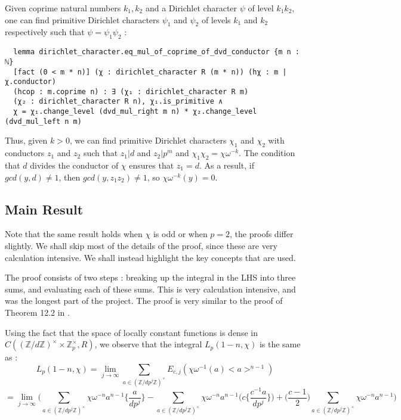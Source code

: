 \documentclass[a4paper,UKenglish,cleveref, autoref, thm-restate]{lipics-v2021}
\begin{document}
Given coprime natural numbers $k_1, k_2$ and a Dirichlet character $\psi$ of level $k_1 k_2$, one can find primitive Dirichlet characters 
$\psi_1$ and $\psi_2$ of levels $k_1$ and $k_2$ respectively such that $\psi = \psi_1 \psi_2$ : 
\begin{lstlisting}
  lemma dirichlet_character.eq_mul_of_coprime_of_dvd_conductor {m n : ℕ} 
  [fact (0 < m * n)] (χ : dirichlet_character R (m * n)) (hχ : m | χ.conductor) 
  (hcop : m.coprime n) : ∃ (χ₁ : dirichlet_character R m) 
  (χ₂ : dirichlet_character R n), χ₁.is_primitive ∧ 
  χ = χ₁.change_level (dvd_mul_right m n) * χ₂.change_level (dvd_mul_left n m) 
\end{lstlisting}

Thus, given $k > 0$, we can find primitive Dirichlet characters $\chi_1$ and $\chi_2$ with conductors $z_1$ and $z_2$ such that 
$z_1 | d$ and $z_2 | p^m$ and $\chi_1 \chi_2 = \chi \omega^{-k}$. The condition that $d$ divides the conductor of $\chi$ ensures 
that $z_1 = d$. As a result, if $gcd (y, d) \ne 1$, then $gcd (y, z_1 z_2) \ne 1$, so $\chi \omega^{-k} (y) = 0$.

\subsection{Main Result}
Note that the same result holds when $\chi$ is odd or when $p = 2$, the proofs differ slightly. We shall 
skip most of the details of the proof, since these are very calculation intensive. We shall instead highlight the key concepts 
that are used. 

The proof consists of two steps : breaking up the integral in the LHS into three sums, 
and evaluating each of these sums. This is very calculation intensive, and was the longest part of the project. 
The proof is very similar to the proof of Theorem 12.2 in \cite{cyc}. 

Using the fact that the space of locally constant functions is dense in $C((\mathbb{Z}/d \mathbb{Z})^{\times} \times \mathbb{Z}_p^{\times}, R)$, 
we observe that the integral $L_p (1 - n, \chi)$ is the same as :
$$ L_p (1 - n, \chi) = \lim_{j \to \infty} \sum_{a \in (\mathbb{Z}/ d p^j \mathbb{Z})^{\times}} E_{c, j} (\chi \omega^{-1} (a) <a>^{n - 1}) \label{eqn:1} $$
$$ = \lim_{j \to \infty} \bigg ( \sum_{a \in (\mathbb{Z}/ d p^j \mathbb{Z})^{\times}} \chi \omega^{-n} a^{n - 1} \bigg \{ \frac{a}{d p^j} \bigg \} - 
  \sum_{a \in (\mathbb{Z}/ d p^j \mathbb{Z})^{\times}} \chi \omega^{-n} a^{n - 1} \bigg ( c \bigg \{ \frac{c^{-1} a}{d p^j} \bigg \} \bigg ) 
  + \bigg ( \frac{c - 1}{2} \bigg ) \sum_{a \in (\mathbb{Z}/ d p^j \mathbb{Z})^{\times}} \chi \omega^{-n} a^{n - 1} \bigg ) $$
\end{document}
